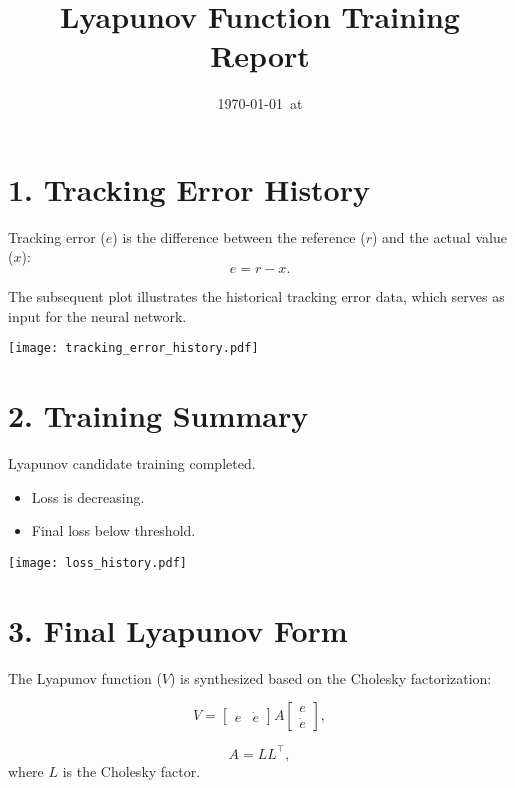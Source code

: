 \documentclass[11pt]{article}
\title{Lyapunov Function Training Report}
\author{}
\date{\today\ at \currenttime}
\begin{document}
\maketitle
\thispagestyle{fancy}

\section*{1. Tracking Error History}
Tracking error ($e$) is the difference between the reference ($r$) and the actual value ($x$):
\begin{equation}
e = r - x.
\end{equation}

\indent The subsequent plot illustrates the historical tracking error data, which serves as input for the neural network.

\begin{center}
\texttt{[image: tracking\_error\_history.pdf]}
\end{center}

\section*{2. Training Summary}
Lyapunov candidate training completed.
\begin{itemize}
  \item  Loss is decreasing.
  \item  Final loss below threshold.
\end{itemize}

\begin{center}
\texttt{[image: loss\_history.pdf]}
\end{center}

\section*{3. Final Lyapunov Form}
The Lyapunov function ($V$) is synthesized based on the Cholesky factorization:

\begin{equation}
V = 
\begin{bmatrix}
e & \dot{e}
\end{bmatrix}
A
\begin{bmatrix}
e \\
\dot{e}
\end{bmatrix},
\end{equation}

\begin{equation}
A = L L^\top,
\end{equation}
where $L$ is the Cholesky factor.
\end{document}
